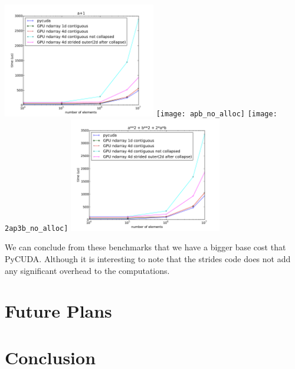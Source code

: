 \documentclass{article} %
\begin{document}
\includegraphics[width=0.5\textwidth]{ap1_no_alloc}
\texttt{[image: apb\_no\_alloc]}
\texttt{[image: 2ap3b\_no\_alloc]}
\includegraphics[width=0.5\textwidth]{a2pb2p2ab_no_alloc}

We can conclude from these benchmarks that we have a bigger base cost that PyCUDA.
Although it is interesting to note that the strides code does not add any significant overhead to the computations.

\section{Future Plans}
\section{Conclusion}

% 
% 
\end{document}
